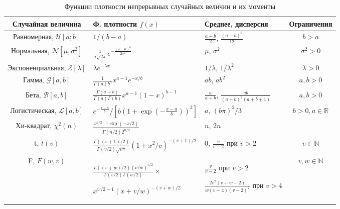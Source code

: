 \begin{table}[h]
\caption{\label{tab:pred} Функции плотности непрерывных случайных величин и их моменты}
\begin{tabular}{cp{6cm}p{4cm}c}
\hline 
\hline
Случайная величина & Ф. плотности $f(x)$ & Среднее, дисперсия & Ограничения\\ 
\hline 
Равномерная, $\mathcal{U}[a;b]$ & $1/(b-a)$ & $\frac{a+b}{2}$, $\frac{(a-b)^2}{12}$ & $b>a$ \\ 
Нормальная, $\mathcal{N}[\mu,\sigma^2]$ & $\frac{1}{\sigma \sqrt{2\pi}}e^{-\frac{(x-\mu)^2}{2\sigma^2}}$ & $\mu$, $\sigma^2$ & $\sigma^2>0$ \\ 
Экспоненциальная, $\mathcal{E}[\lambda]$ & $\lambda e^{-\lambda x}$ & $1/\lambda$, $1/\lambda^2$ & $\lambda>0$ \\ 
Гамма, $\mathcal{G}[a,b]$ & $\frac{1}{\Gamma(a)b^a}x^{a-1}e^{-x/b}$ & $ab$, $ab^2$ & $a,b>0$ \\ 
Бета, $\mathcal{B}[a,b]$ & $\frac{\Gamma(a+b)}{\Gamma(a)\Gamma(b)}x^{a-1}(1-x)^{b-1}$ & $\frac{a}{a+b}$, $\frac{ab}{(a+b)^2(a+b+1)}$ & $a,b>0$ \\ 
Логистическая, $\mathcal{L}[a,b]$ & $e^{-\frac{x-a}{b}}/[b(1+\exp(-\frac{x-a}{b}))^2]$ & $a$, $(b\pi)^2/3$ & $b>0, a \in \mathbb{R}$ \\ 
Хи-квадрат, $\chi^2(n)$ & $\frac{x^{n/2-1}\exp(-x/2)}{\Gamma(n/2)2^{n/2}}$ & $n$, $2n$ & \\ 
t, $t(v)$ & $\frac{\Gamma((v+1)/2)}{\Gamma(v/2)\sqrt{v\pi}}(1+x^2/v)^{-(v+1)/2}$ & $0$, $\frac{v}{v-2}$ при $v>2$ & $v\in\mathbb{N}$ \\ 
F, $F(w,v)$ & $\frac{\Gamma((v+w)/2)(v/w)^{v/2}}{\Gamma(v/2)\Gamma(w/2)}\times$

$x^{w/2-1}(x+v/w)^{-(v+w)/2}$ & $\frac{v}{v-2}$ при $v>2$  

$\frac{2v^2(v+w-2)}{w(v-4)(v-2)^2}$ при $v>4$ & $v,w\in\mathbb{N}$\\
\hline
\hline
\end{tabular} 
\end{table}

